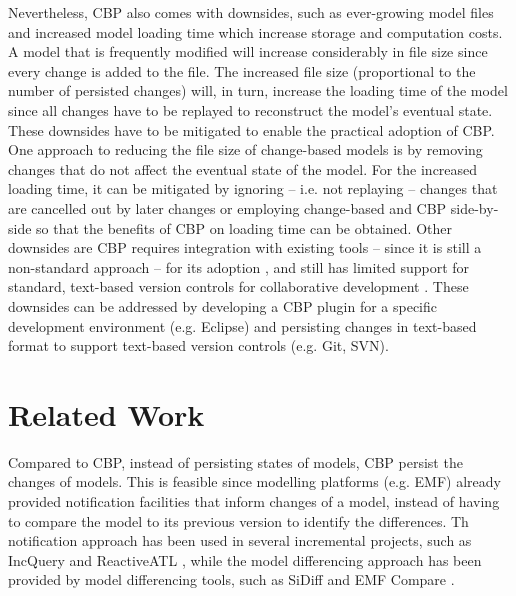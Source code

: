 \documentclass[sigplan,review,anonymous]{acmart}\settopmatter{printfolios=true,printccs=false,printacmref=false}
\begin{document}
Nevertheless, CBP also comes with downsides, such as ever-growing model files \cite{DBLP:journals/entcs/RobbesL07,DBLP:conf/edoc/KoegelHLHD10} and increased model loading time \cite{mens2002state} which increase storage and computation costs. A model that is frequently modified will increase considerably in file size since every change is added to the file. The increased file size (proportional to the number of persisted changes) will, in turn, increase the loading time of the model since all changes have to be replayed to reconstruct the model's eventual state. These downsides have to be mitigated to enable the practical adoption of CBP. One approach to reducing the file size of change-based models is by removing changes that do not affect the eventual state of the model. For the increased loading time, it can be mitigated by ignoring -- i.e. not replaying -- changes that are cancelled out by later changes or employing change-based and CBP side-by-side so that the benefits of CBP on loading time can be obtained. Other downsides are CBP requires integration with existing tools -- since it is still a non-standard approach -- for its adoption \cite{koegel2010emfstore}, and still has limited support for standard, text-based version controls for collaborative development \cite{koegel2010emfstore}. These downsides can be addressed by developing a CBP plugin for a specific development environment (e.g. Eclipse) and persisting changes in text-based format to support text-based version controls (e.g. Git, SVN).


\section{Related Work}
Compared to CBP, instead of persisting states of models, CBP persist the changes of models. This is feasible since modelling platforms (e.g. EMF) already provided notification facilities that inform changes of a model, instead of having to compare the model to its previous version to identify the differences. Th notification approach has been used in several incremental projects, such as IncQuery \cite{DBLP:conf/ecmdafa/RathHV12} and ReactiveATL \cite{DBLP:conf/ecmdafa/OgunyomiRK15}, while the model differencing approach has been provided by model differencing tools, such as SiDiff \cite{kelter2005generic} and EMF Compare \cite{eclipse2017compare}.
\end{document}
